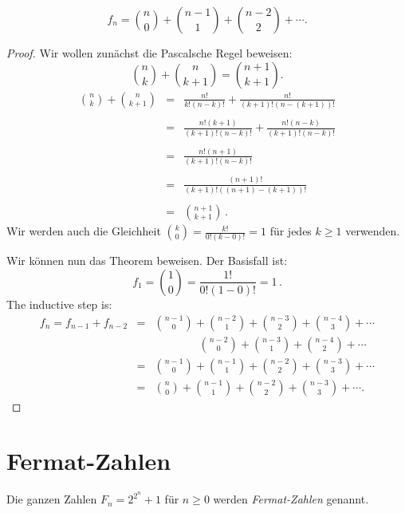 
\begin{theorem}
\[
f_n = \binom{n}{0} + \binom{n-1}{1} + \binom{n-2}{2} + \cdots.
\]
\end{theorem}

\begin{proof}
Wir wollen zunächst die Pascalsche Regel beweisen:
\[
\binom{n}{k} + \binom{n}{k+1} = \binom{n+1}{k+1}.
\]
\begin{eqnarray*}
\binom{n}{k} + \binom{n}{k+1} &=& \frac{n!}{k!(n-k)!} + \frac{n!}{(k+1)!(n-(k+1))!}\\
\\
&=&\frac{n!(k+1)}{(k+1)!(n-k)!}+\frac{n!(n-k)}{(k+1)!(n-k)!}\\\\
&=&\frac{n!(n+1)}{(k+1)!(n-k)!}\\\\
&=&\frac{(n+1)!}{(k+1)!((n+1)-(k+1))!}\\\\
&=&\binom{n+1}{k+1}\,.
\end{eqnarray*}
Wir werden auch die Gleichheit $\displaystyle\binom{k}{0} = \frac{k!}{0!(k-0)!} = 1$ für jedes $k\geq 1$ verwenden.

Wir können nun das Theorem beweisen. Der Basisfall ist:
\[
f_1 =  \binom{1}{0} = \frac{1!}{0!(1-0)!}=1\,.
\]
The inductive step is:
\begin{eqnarray*}
f_n=f_{n-1} + f_{n-2} &=& \binom{n-1}{0} + \binom{n-2}{1} + \binom{n-3}{2} + \binom{n-4}{3} + \cdots\\
&&\quad\quad\quad\quad\binom{n-2}{0} + \binom{n-3}{1} + \binom{n-4}{2} + \cdots\\
&=&\binom{n-1}{0} + \binom{n-1}{1} + \binom{n-2}{2} + \binom{n-3}{3} + \cdots\\
&=&\binom{n}{0} + \binom{n-1}{1} + \binom{n-2}{2} + \binom{n-3}{3} + \cdots.
\end{eqnarray*}

\end{proof}



\section{Fermat-Zahlen}\label{s.induction-fermat}
\begin{definition}
Die ganzen Zahlen $F_n=2^{2^{n}}+1$ für $n\geq 0$ werden \emph{Fermat-Zahlen} genannt.
\end{definition}

